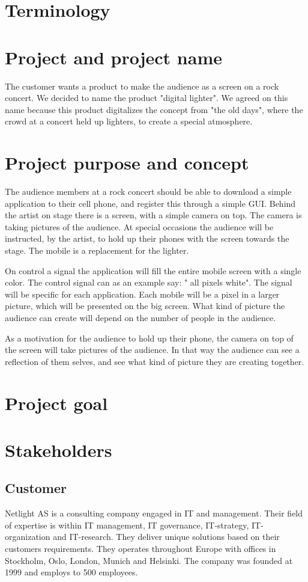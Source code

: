 \section {Terminology}
\section{Project and project name}

The customer wants a product to make the audience as a screen on a rock concert. We decided to name the product "digital lighter". We agreed on this name because this product digitalizes the concept from "the old days", where the crowd at a concert held up lighters, to create a special atmosphere. 

\section{Project purpose and concept}

The audience members at a rock concert should be able to download a simple application to their cell phone, and register this through a simple GUI.
Behind the artist on stage there is a screen, with a simple camera on top. 
The camera is taking pictures of the audience. 
At special occasions the audience will be instructed, by the artist, to hold up their phones with the screen towards the stage. 
The mobile is a replacement for the lighter.  

On control a signal the application will fill the entire mobile screen with a single color.
The control signal can as an example say: " all pixels white". 
The signal will be specific for each application.
Each mobile will be a pixel in a larger picture, which will be presented on the big screen. 
What kind of picture the audience can create will depend on the number of people in the audience.   

As a motivation for the audience to hold up their phone, the camera on top of the screen will take pictures of the audience.
In that way the audience can see a reflection of them selves, and see what kind of picture they are creating together.

\section{Project goal}
\section{Stakeholders}
\subsection{Customer}
Netlight AS is a consulting company engaged in IT and management. Their field of expertise is within IT management, IT governance, IT-strategy, IT-organization and IT-research. They deliver unique solutions based on their customers requirements. They operates throughout Europe with offices in Stockholm, Oslo, London, Munich and Helsinki. The company was founded at 1999 and employs to 500 employees. 
